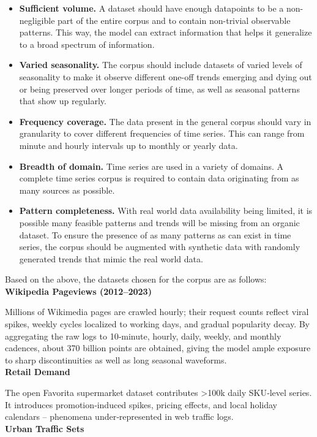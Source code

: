 \begin{itemize}
    \item \textbf{Sufficient volume.} A dataset should have enough datapoints to be a non-negligible part of the entire corpus and to contain non-trivial observable patterns. This way, the model can extract information that helps it generalize to a broad spectrum of information.
    \item \textbf{Varied seasonality.} The corpus should include datasets of varied levels of seasonality to make it observe different one-off trends emerging and dying out or being preserved over longer periods of time, as well as seasonal patterns that show up regularly.
    \item \textbf{Frequency coverage.} The data present in the general corpus should vary in granularity to cover different frequencies of time series. This can range from minute and hourly intervals up to monthly or yearly data.
    \item \textbf{Breadth of domain.} Time series are used in a variety of domains. A complete time series corpus is required to contain data originating from as many sources as possible.
    \item \textbf{Pattern completeness.} With real world data availability being limited, it is possible many feasible patterns and trends will be missing from an organic dataset. To ensure the presence of as many patterns as can exist in time series, the corpus should be augmented with synthetic data with randomly generated trends that mimic the real world data.
\end{itemize}
Based on the above, the datasets chosen for the corpus are as follows:
\\\textbf{Wikipedia Pageviews (2012–2023)}

Millions of Wikimedia pages are crawled hourly; their request counts reflect viral spikes, weekly cycles localized to working days, and gradual popularity decay. By aggregating the raw logs to 10‑minute, hourly, daily, weekly, and monthly cadences, about 370 billion points are obtained, giving the model ample exposure to sharp discontinuities as well as long seasonal waveforms. %
\\\textbf{Retail Demand}

The open Favorita supermarket dataset contributes >100k daily SKU‑level series.  It introduces promotion‑induced spikes, pricing effects, and local holiday calendars – phenomena under‑represented in web traffic logs.
\\\textbf{Urban Traffic Sets}

